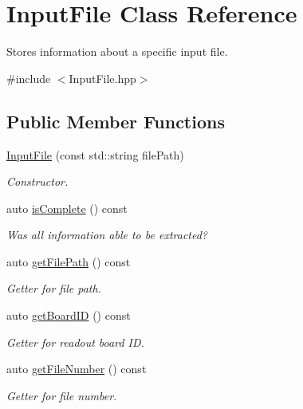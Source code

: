 \hypertarget{class_input_file}{}\section{Input\+File Class Reference}
\label{class_input_file}


Stores information about a specific input file.  




{\ttfamily \#include $<$Input\+File.\+hpp$>$}

\subsection*{Public Member Functions}
\begin{DoxyCompactItemize}
\item 
\hyperlink{class_input_file_a36704203477e78e7de3ff4b98276e3a6}{Input\+File} (const std\+::string file\+Path)
\begin{DoxyCompactList}\small\item\em Constructor. \end{DoxyCompactList}\item 
auto \hyperlink{class_input_file_a65406d6a016391c2cccb0e6e4ee08099}{is\+Complete} () const
\begin{DoxyCompactList}\small\item\em Was all information able to be extracted? \end{DoxyCompactList}\item 
auto \hyperlink{class_input_file_a2e3685bddcae984f458e7fc6a20e7a44}{get\+File\+Path} () const
\begin{DoxyCompactList}\small\item\em Getter for file path. \end{DoxyCompactList}\item 
auto \hyperlink{class_input_file_a340d5150a1c03a07496d0a67580f5c70}{get\+Board\+ID} () const
\begin{DoxyCompactList}\small\item\em Getter for readout board ID. \end{DoxyCompactList}\item 
auto \hyperlink{class_input_file_a1a1a9c0d87f77e580e03da608b1b5291}{get\+File\+Number} () const
\begin{DoxyCompactList}\small\item\em Getter for file number. \end{DoxyCompactList}\item 

\end{DoxyCompactItemize}

